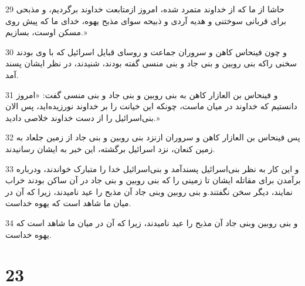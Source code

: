 \par 29 حاشا از ما که از خداوند متمرد شده، امروز ازمتابعت خداوند برگردیم، و مذبحی برای قربانی سوختنی و هدیه آردی و ذبیحه سوای مذبح یهوه، خدای ما که پیش روی مسکن اوست، بسازیم.»
\par 30 و چون فینحاس کاهن و سروران جماعت و روسای قبایل اسرائیل که با وی بودند سخنی راکه بنی روبین و بنی جاد و بنی منسی گفته بودند، شنیدند، در نظر ایشان پسند آمد.
\par 31 و فینحاس بن العازار کاهن به بنی روبین و بنی جاد و بنی منسی گفت: «امروز دانستیم که خداوند در میان ماست، چونکه این خیانت را بر خداوند نورزیده‌اید، پس الان بنی‌اسرائیل را از دست خداوند خلاصی دادید.»
\par 32 پس فینحاس بن العازار کاهن و سروران ازنزد بنی روبین و بنی جاد از زمین جلعاد به زمین کنعان، نزد اسرائیل برگشته، این خبر به ایشان رسانیدند.
\par 33 و این کار به نظر بنی‌اسرائیل پسندآمد و بنی‌اسرائیل خدا را متبارک خواندند، ودرباره برآمدن برای مقاتله ایشان تا زمینی را که بنی روبین و بنی جاد در آن ساکن بودند خراب نمایند، دیگر سخن نگفتند.و بنی روبین وبنی جاد آن مذبح را عید نامیدند، زیرا که آن در میان ما شاهد است که یهوه خداست.
\par 34 و بنی روبین وبنی جاد آن مذبح را عید نامیدند، زیرا که آن در میان ما شاهد است که یهوه خداست.
 
\chapter{23}

